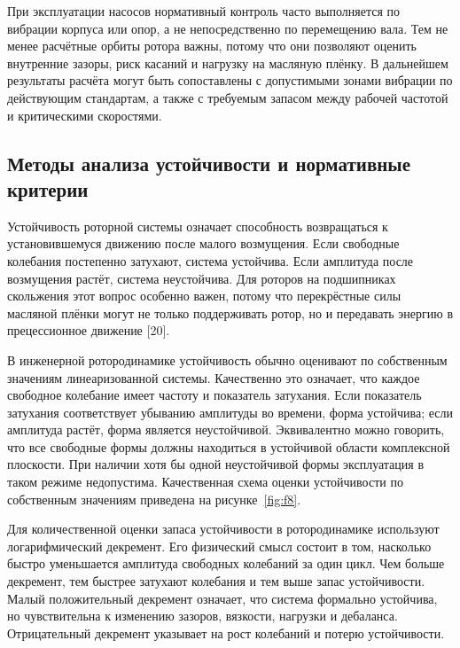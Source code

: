 При эксплуатации насосов нормативный контроль часто выполняется по вибрации корпуса или опор, а не непосредственно по перемещению вала. Тем не менее расчётные орбиты ротора важны, потому что они позволяют оценить внутренние зазоры, риск касаний и нагрузку на масляную плёнку. В дальнейшем результаты расчёта могут быть сопоставлены с допустимыми зонами вибрации по действующим стандартам, а также с требуемым запасом между рабочей частотой и критическими скоростями.

\subsection{Методы анализа устойчивости и нормативные критерии}

Устойчивость роторной системы означает способность возвращаться к установившемуся движению после малого возмущения. Если свободные колебания постепенно затухают, система устойчива. Если амплитуда после возмущения растёт, система неустойчива. Для роторов на подшипниках скольжения этот вопрос особенно важен, потому что перекрёстные силы масляной плёнки могут не только поддерживать ротор, но и передавать энергию в прецессионное движение [20].

В инженерной ротородинамике устойчивость обычно оценивают по собственным значениям линеаризованной системы. Качественно это означает, что каждое свободное колебание имеет частоту и показатель затухания. Если показатель затухания соответствует убыванию амплитуды во времени, форма устойчива; если амплитуда растёт, форма является неустойчивой. Эквивалентно можно говорить, что все свободные формы должны находиться в устойчивой области комплексной плоскости. При наличии хотя бы одной неустойчивой формы эксплуатация в таком режиме недопустима. Качественная схема оценки устойчивости по собственным значениям приведена на рисунке~\ref{fig:f8}.

Для количественной оценки запаса устойчивости в ротородинамике используют логарифмический декремент. Его физический смысл состоит в том, насколько быстро уменьшается амплитуда свободных колебаний за один цикл. Чем больше декремент, тем быстрее затухают колебания и тем выше запас устойчивости. Малый положительный декремент означает, что система формально устойчива, но чувствительна к изменению зазоров, вязкости, нагрузки и дебаланса. Отрицательный декремент указывает на рост колебаний и потерю устойчивости.


